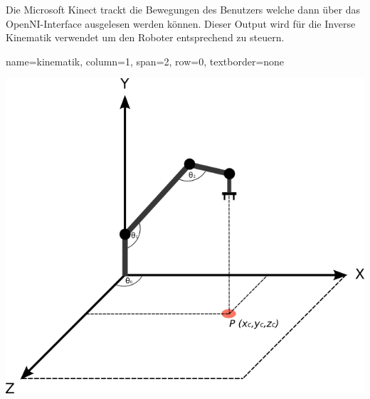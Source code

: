 \documentclass[portrait,a0paper]{baposter}
\begin{document}
\begin{poster}
{Die Microsoft Kinect trackt die Bewegungen des Benutzers welche dann über das OpenNI-Interface ausgelesen werden können. Dieser Output wird für die Inverse Kinematik verwendet um den Roboter entsprechend zu steuern.
 }






    {
    name=kinematik,
    column=1,
    span=2,
    row=0,
    textborder=none
    }
    {
        \includegraphics[width=\textwidth]{imgs/3d_robo.png}

 }




\end{poster}
\end{document}
